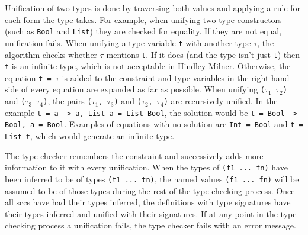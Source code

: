 Unification of two types is done by traversing both values and applying a rule for each form the type takes. For example, when unifying two type constructors (such as \texttt{Bool} and \texttt{List}) they are checked for equality. If they are not equal, unification fails. When unifying a type variable \texttt{t} with another type \texttt{$\tau$}, the algorithm checks whether \texttt{$\tau$} mentions \texttt{t}. If it does (and the type isn't just \texttt{t}) then \texttt{t} is an infinite type, which is not acceptable in Hindley-Milner. Otherwise, the equation \texttt{t = $\tau$} is added to the constraint and type variables in the right hand side of every equation are expanded as far as possible. When unifying \texttt{($\tau_1$ $\tau_2$)} and \texttt{($\tau_3$ $\tau_4$)}, the pairs \texttt{($\tau_1$, $\tau_3$)} and \texttt{($\tau_2$, $\tau_4$)} are recursively unified.  In the example \texttt{t = a -> a, List a = List Bool}, the solution would be \texttt{t = Bool -> Bool, a = Bool}. Examples of equations with no solution are \texttt{Int = Bool} and \texttt{t = List t}, which would generate an infinite type. 

The type checker remembers the constraint and successively adds more information to it with every unification.
When the types of \texttt{(f1 ... fn)} have been inferred to be of types \texttt{(t1 ... tn)}, the named values \texttt{(f1 ... fn)} will be assumed to be of those types during the rest of the type checking process. Once all \glspl{scc} have had their types inferred, the definitions with type signatures have their types inferred and unified with their signatures. If at any point in the type checking process a \gls{unification} fails, the type checker fails with an error message.




